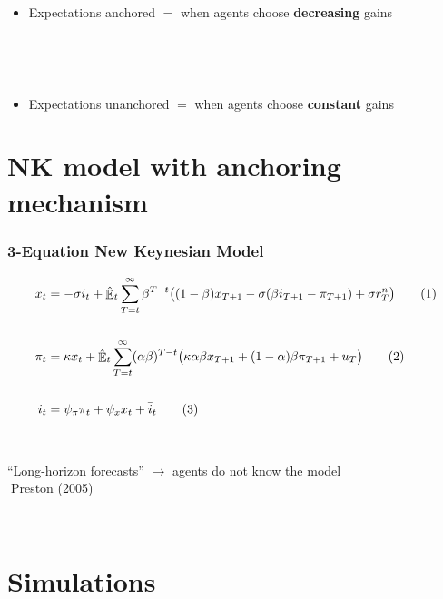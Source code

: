 \documentclass{beamer}
\DeclareMathOperator{\E}{\mathbb{E}}
\newcommand\numberthis{\addtocounter{equation}{1}\tag{\theequation}} %
\begin{document}
\begin{frame}
	\frametitle{}
	
	


\begin{itemize}
\item Expectations anchored $ = $ when agents choose \textbf{decreasing} gains

\

\

\item Expectations unanchored $ = $ when agents choose \textbf{constant} gains
\end{itemize}



\end{frame}



\section{NK model with anchoring mechanism}

\begin{frame}
	\frametitle{3-Equation New Keynesian Model}
	\label{NK}

\begin{align*}
x_t &=  -\sigma i_t +\hat{\E}_t \sum_{T=t}^{\infty} \beta^{T-t }\big( (1-\beta)x_{T+1} - \sigma(\beta i_{T+1} - \pi_{T+1}) +\sigma r_T^n \big) \label{prestons18}  \numberthis \\
\\
\pi_t &= \kappa x_t +\hat{\E}_t \sum_{T=t}^{\infty} (\alpha\beta)^{T-t }\big( \kappa \alpha \beta x_{T+1} + (1-\alpha)\beta \pi_{T+1} + u_T\big) \label{prestons19}  \numberthis \\
\\
i_t &= \psi_{\pi}\pi_t + \psi_{x} x_t + \bar{i}_t \label{TR} \numberthis
\end{align*}

\

``Long-horizon forecasts'' $\rightarrow$ agents do not know the model\\
$\; $Preston (2005)

\

\hyperlink{compact}{}	


\end{frame}



\section{Simulations}
\end{document}
